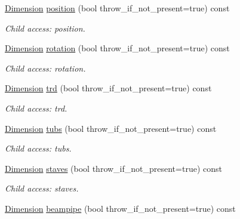 \begin{DoxyCompactItemize}
\hyperlink{struct_d_d4hep_1_1_x_m_l_1_1_dimension}{Dimension} \hyperlink{struct_d_d4hep_1_1_x_m_l_1_1_dimension_ade822cf5553f636e5679f2cd2d4733fa}{position} (bool throw\_\-if\_\-not\_\-present=true) const 
\begin{DoxyCompactList}\small\item\em Child access: position. \item\end{DoxyCompactList}\item 
\hyperlink{struct_d_d4hep_1_1_x_m_l_1_1_dimension}{Dimension} \hyperlink{struct_d_d4hep_1_1_x_m_l_1_1_dimension_a6482cbcea45b29672561a8454383e55c}{rotation} (bool throw\_\-if\_\-not\_\-present=true) const 
\begin{DoxyCompactList}\small\item\em Child access: rotation. \item\end{DoxyCompactList}\item 
\hyperlink{struct_d_d4hep_1_1_x_m_l_1_1_dimension}{Dimension} \hyperlink{struct_d_d4hep_1_1_x_m_l_1_1_dimension_a46766eff05cc8175394310649789f514}{trd} (bool throw\_\-if\_\-not\_\-present=true) const 
\begin{DoxyCompactList}\small\item\em Child access: trd. \item\end{DoxyCompactList}\item 
\hyperlink{struct_d_d4hep_1_1_x_m_l_1_1_dimension}{Dimension} \hyperlink{struct_d_d4hep_1_1_x_m_l_1_1_dimension_a07f4362642a3df08007d05465265af1c}{tubs} (bool throw\_\-if\_\-not\_\-present=true) const 
\begin{DoxyCompactList}\small\item\em Child access: tubs. \item\end{DoxyCompactList}\item 
\hyperlink{struct_d_d4hep_1_1_x_m_l_1_1_dimension}{Dimension} \hyperlink{struct_d_d4hep_1_1_x_m_l_1_1_dimension_a7f07e3e3003710147718bab54c2dfd3e}{staves} (bool throw\_\-if\_\-not\_\-present=true) const 
\begin{DoxyCompactList}\small\item\em Child access: staves. \item\end{DoxyCompactList}\item 
\hyperlink{struct_d_d4hep_1_1_x_m_l_1_1_dimension}{Dimension} \hyperlink{struct_d_d4hep_1_1_x_m_l_1_1_dimension_a9c2eabfa96db3c9ed090a7e955851d16}{beampipe} (bool throw\_\-if\_\-not\_\-present=true) const 

\end{DoxyCompactItemize}
